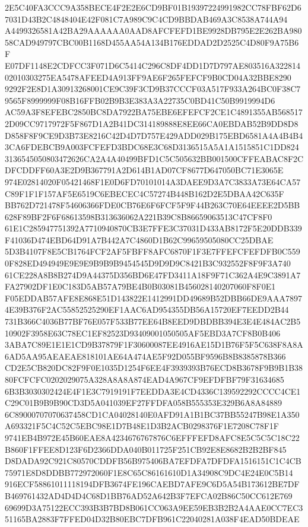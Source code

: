 \documentclass[UTF8,fontset=fandol,zihao=-4,a4paper]{ctexart}
\begin{document}
{{2E5C40FA3CCC9A358BECE4F2E2E6CD9BF01B19397224991982CC78FBF62D67031D43B2C4848404E42F081C7A989C9C4CD9BBDAB469A3C8538A744A94
A4499326581A42BA29AAAAAA0AAD8AFCFEFD1BE9928DB795E2E262BA98058CAD949797CBC00B1168D455AA54A134B176EDDAD2D2525C4D80F9A75B6F
E07DF1148E2CDFCC3F071D6C5414C296C8DF4DD1D7D797AE803516A32281402010303275EA5478AFEED4A913FF9AE6F265FEFCF9B0CD04A32BBE8290
9292F2E8D1A30913268001CE9C39F3CD9B37CCCF03A517F933A264BC0F38C79565F8999999F08B16FFB02B9B3E383A3A22735C0BD41C50B9919994D6
AC59A3F8EFEBC2850BC8DA7922BA75EBE6EFEFCF2CE1C4891355AB5685172D09CC9717972F5F867D1A2B41DC314189888E8EE66CA0EBDAB52B9DD8D8
D858F8F9CE9D3B73E8216C42D4D7D757E429ADD029B175EBD6581A4A4B4B43CA6FDEBCB9A003FCFEFD3BDC68E3C68D3136515A5A1A1515851C1DD824
3136545050803472626CA2A4A40499BFD1C5C505632BB001500CFFEABAC8F2CDFCDDFF60A3E2D9B367791A2D614B1AD07CF8677D647050BC71E3065E
974E02814020F05421468F1E0D6FD70101014A3DAEE9D3A7C3833A73E64CA57C89F1F1F157AF5E6519C6EBECEC4C57274B448B162D2E5DBAA42C635F
BB762D721478F54606366FDE0CB76E6F6FCF5F9F44B263C70E64EEEE2D5BB628F89BF2F6F68613598B313636062A221B39C8B86659063513C47CF8F0
61E1C285947751392A7710940870CB3E7FFE3C37031D433AB8172F5E20DDB339F41036D474EBD64D91A7B442A7C4860D1B62C99659505080CC25DBAE
5D3B4107F8E5CB1764FCF2AF5FBFF8AFC6870F1F3E7FFEFCFEFDFB0C5590F828ED494949E9E9E9B9B9B9454545D9D9D9C8421B3C932552F8F9F3A740
61CE228A8B8B274D9A44375D356BD6E47FD3411A18F9F71C362A4E9C3891A7FA27902DF1E0C183D5AB57A79BE4B0B03081B456028140207060F8F0E1
F05EDDAB57AFE8E868E51D143822E1412991DD49689B52DBB66DE9AAA78974E39B376F2AC55852525290EF1AAC6AD954355DB56A15720EF7EEDD2B44
731B366C4036B77BF76E057F533B77EE64B8EED9DBDBB394E3E4E484AC2B510902F3958E63C78EC1EF82523D93409001050505AF5EBD3A7CF8B0B406
3ABA7C89E1E1E1CD9B37879F1F30600087EE4916AE15D1B76F5F5C638F8A8A6AD5AA95AEAEAE818101AE64A474AE5F92D055BF9596B8B8385878B366
CD2E5CB820DC82F9F0E1035D1254F6EE4F3939393B76ECD8B3678F9B9B1B3880FCFCFC0202029075A328A8A8A874EAD4A967CF9EFDFBF79F31634685
6B3B3030302424E4F1E3C7919191F7EEDDA3E4CD4336C139592292CCCC4CE1C29C01B9B9B90CD3D5A041039EF27FFDFA058B555353E329B6A8A84889
6C89000707070637458CD1CA04028140E0AFD91A1B1BC37BB55247B98E1A350A693321F5C4C52C5EBC98E1D7B48E1D3B2ACB0298376F1E7208C78F1F
9741EB4B972E45B60EAE8A4234676767876C6EFFFEFD8AFC8E5C5C5C18C22B860F1FFEE8D123F6D2366DDA040B011725F251CB92E8E8682B2B2BF845
D8DADA92C921C80570CDDFB56B975406BA7EFDFA7DFDFA1516151C1C4CB75971E8D8DDBB772972060F1E8C65C86161610D1A34908C9DC4E24E0C5B14
916ECF58861011118194DFB3674FE196CAEBD7AFE9C6D5A54B173612BE7DFB469761432AD4D4D4C68D1BB76AD52A642B3F7EFCA02B86C50CC612E769
69699D3A75122ECC393B3B7BD8B061CC063A9EE59EB3B2B2A4AAE0CC7EC351165BA2883F7FFED04D32B80EBC7DFB961C22040281A038F4EAD50BDEAE
}}
\end{document}
